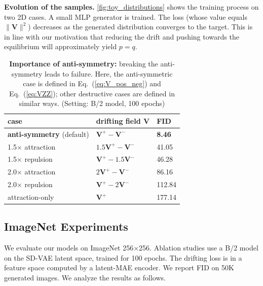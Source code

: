 \documentclass{article}
\newcommand{\tablestyle}[2]{\setlength{\tabcolsep}{#1}\renewcommand{\arraystretch}{#2}\centering
\small
}
\newcommand\tablefontsize{%
  \fontsize{8pt}{9pt}\selectfont
}
\newcommand{\vv}[1]{\mathbf{#1}}
\newcommand{\V}{\vv{V}}
\renewcommand{\paragraph}[1]{\vspace{.05em}\noindent\textbf{#1}}
\theoremstyle{plain}
\theoremstyle{definition}
\theoremstyle{remark}
\begin{document}
\paragraph{Evolution of the samples.}
\cref{fig:toy_distributions} shows the training process
on two 2D cases. A small MLP generator is trained.
The loss (whose value equals $\|\V\|^2$) decreases as the generated distribution converges to the target.
This is in line with our motivation that reducing the drift and pushing towards the equilibrium will approximately yield $p = q$.




\begin{table}[t]
\caption{
\textbf{Importance of anti-symmetry:}
breaking the anti-symmetry leads to failure. Here, the anti-symmetric case is defined in Eq.~(\ref{eq:V_pos_neg}) and Eq.~(\ref{eq:VZZ});
other destructive cases are defined in similar ways.
(Setting: B/2 model, 100 epochs)
}
\label{tab:ablation_antisymmetry}
\tablestyle{4pt}{1.05}
\tablefontsize
\begin{tabular}{y{100}x{60}z{35}}
\toprule
case & drifting field $\V$ & FID \\
\midrule
\textbf{anti-symmetry} (default) & $\V^+ - \V^-$ & \textbf{8.46} \\
$\times$ attraction & $1.5\V^+ - \V^-$ & 41.05 \\
1.5$\times$ repulsion & $\V^+ - 1.5\V^-$ & 46.28 \\
2.0$\times$ attraction & $2\V^+ - \V^-$ & 86.16 \\
2.0$\times$ repulsion & $\V^+ - 2\V^-$ & 112.84 \\
attraction-only & $\V^+$ & 177.14 \\
\bottomrule
\end{tabular}
\end{table}

\subsection{ImageNet Experiments}

We evaluate our models on ImageNet 256$\times$256. Ablation studies use a B/2 model on the SD-VAE latent space, trained for 100 epochs.
The drifting loss is in a feature space computed by a latent-MAE encoder.
We report FID \cite{fid} on 50K generated images.
We analyze the results as follows.
\end{document}
